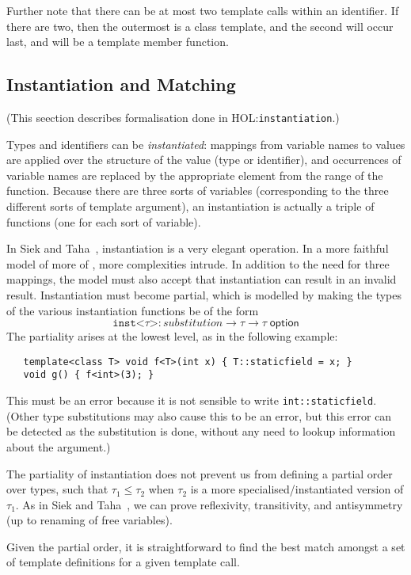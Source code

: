 \documentclass[11pt]{article}
\newcommand{\HOLfile}[1]{HOL:\texttt{#1}}
\begin{document}
Further note that there can be at most two template calls within an
identifier.  If there are two, then the outermost is a class template,
and the second will occur last, and will be a template member
function.

\subsection{Instantiation and Matching}

(This seection describes formalisation done in
\HOLfile{instantiation}.) 

\medskip
\noindent Types and identifiers can be \emph{instantiated}: mappings
from variable names to values are applied over the structure of the
value (type or identifier), and occurrences of variable names are
replaced by the appropriate element from the range of the function.
Because there are three sorts of variables (corresponding to the three
different sorts of template argument), an instantiation is actually a
triple of functions (one for each sort of variable).

In Siek and Taha~\cite{DBLP:conf/ecoop/SiekT06}, instantiation is a
very elegant operation.  In a more faithful model of more of \cpp,
more complexities intrude.  In addition to the need for three
mappings, the model must also accept that instantiation can result in
an invalid result.  Instantiation must become partial, which is
modelled by making the types of the various instantiation functions be
of the form
\[
\texttt{inst<}\tau\texttt{>} : \mathit{substitution} \to \tau
\to \tau\;\textsf{option}
\]
The partiality arises at the lowest level, as in the following
example:
\begin{verbatim}
   template<class T> void f<T>(int x) { T::staticfield = x; }
   void g() { f<int>(3); }
\end{verbatim}
This must be an error because it is not sensible to write
\texttt{int::staticfield}.  (Other type substitutions may also cause
this to be an error, but this error can be detected as the
substitution is done, without any need to lookup information about the
argument.)

The partiality of instantiation does not prevent us from defining a
partial order over types, such that $\tau_1 \leq \tau_2$ when $\tau_2$
is a more specialised/instantiated version of $\tau_1$.  As in Siek
and Taha~\cite{DBLP:conf/ecoop/SiekT06}, we can prove reflexivity,
transitivity, and antisymmetry (up to renaming of free variables).

Given the partial order, it is straightforward to find the best match
amongst a set of template definitions for a given template call.
\end{document}
